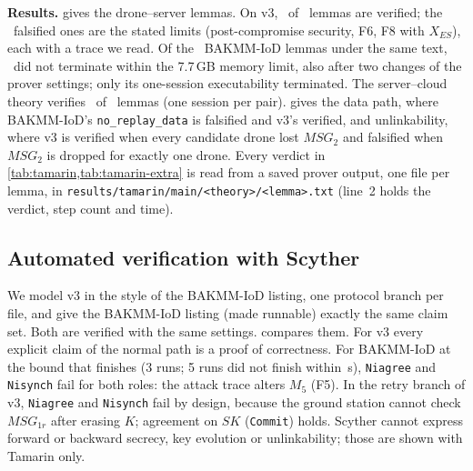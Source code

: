 \textbf{Results.}  gives the drone--server lemmas. On v3, \NumVthreeVerified\ of \NumVthreeLemmas\ lemmas
are verified; the \NumVthreeFalsified\ falsified ones are the stated limits (post-compromise security, F6, F8 with $X_{ES}$),
each with a trace we read. Of the \NumBakmmBaseLemmas\ BAKMM-IoD lemmas under the same text, \NumBakmmBaseDNT\ did not
terminate within the 7.7\,GB memory limit, also after two changes of the prover settings; only its one-session
executability terminated. The server--cloud theory verifies \NumCSverified\ of \NumCSlemmas\ lemmas (one session per pair).  gives the
data path, where BAKMM-IoD's \texttt{no\_replay\_data} is falsified and v3's verified, and unlinkability, where v3 is verified
when every candidate drone lost $MSG_2$ and falsified when $MSG_2$ is dropped for exactly one drone.
Every verdict in \cref{tab:tamarin,tab:tamarin-extra} is read from a saved prover output, one file per lemma, in
\texttt{results/tamarin/main/<theory>/<lemma>.txt} (line~2 holds the verdict, step count and time).



\subsection{Automated verification with Scyther}\label{sec:scyther}
We model v3 in the style of the BAKMM-IoD listing, one protocol branch per file, and give the BAKMM-IoD listing (made
runnable) exactly the same claim set. Both are verified with the same settings.  compares them. For v3 every
explicit claim of the normal path is a proof of correctness. For BAKMM-IoD at the bound that finishes (3 runs; 5 runs did not finish
within \ScyBakmmFiveSecs\,s), \texttt{Niagree} and \texttt{Nisynch} fail for both roles: the attack trace alters $M_5$ (F5). In
the retry branch of v3, \texttt{Niagree} and \texttt{Nisynch} fail by design, because the ground station cannot check
$MSG_{1r}$ after erasing $K$; agreement on $SK$ (\texttt{Commit}) holds. Scyther cannot express forward or backward secrecy,
key evolution or unlinkability; those are shown with Tamarin only.


